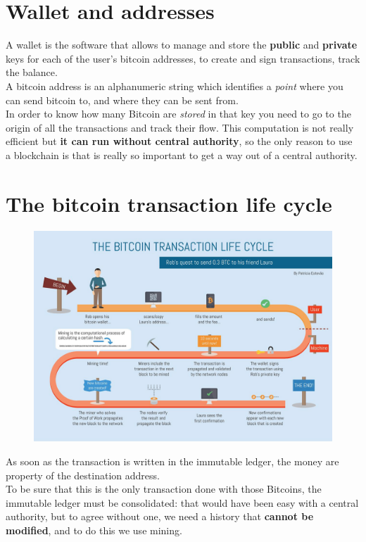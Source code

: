     \section{Wallet and addresses}
        A wallet is the software that allows to manage and store the \textbf{public} and \textbf{private} keys for each of the user's bitcoin addresses, to create and sign transactions, track the balance.\\
        A bitcoin address is an alphanumeric string which identifies a \textit{point} where you can send bitcoin to, and where they can be sent from.\\
        In order to know how many Bitcoin are \textit{stored} in that key you need to go to the origin of all the transactions and track their flow. This computation is not really efficient but \textbf{it can run without central authority}, so the only reason to use a blockchain is that is really so important to get a way out of a central authority.
    \section{The bitcoin transaction life cycle}
        \begin{figure}[ht!]
            \centering
            \includegraphics[width=0.6\linewidth]{lifecycle.png}
        \end{figure}
        As soon as the transaction is written in the immutable ledger, the money are property of the destination address.\\
        To be sure that this is the only transaction done with those Bitcoins, the immutable ledger must be consolidated: that would have been easy with a central authority, but to agree without one, we need a history that \textbf{cannot be modified}, and to do this we use mining.
